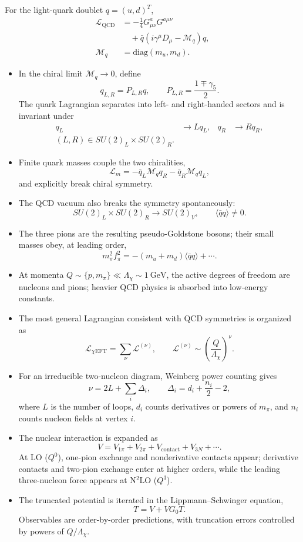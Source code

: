 \documentclass[a4paper]{article}
\newcommand{\bi}{\begin{itemize}}
\newcommand{\ei}{\end{itemize}}
\begin{document}
{
For the light-quark doublet $q=(u,d)^T$,
\[
\begin{aligned}
\mathcal{L}_{\mathrm{QCD}}
&=
-\frac{1}{4}G_{\mu\nu}^aG^{a\mu\nu}
\\
&\quad
+\bar q\left(i\gamma^\mu D_\mu-\mathcal{M}_q\right)q,
\\
\mathcal{M}_q
&=
\mathrm{diag}(m_u,m_d).
\end{aligned}
\]
\bi
\item In the chiral limit $\mathcal{M}_q\to0$, define
\[
q_{L,R}=P_{L,R}q,
\qquad
P_{L,R}=\frac{1\mp\gamma_5}{2}.
\]
The quark Lagrangian separates into left- and right-handed sectors and is invariant under
\[
\begin{aligned}
q_L&\to Lq_L,
&
q_R&\to Rq_R,
\\
(L,R)\in SU(2)_L\times SU(2)_R.
\end{aligned}
\]
\item Finite quark masses couple the two chiralities,
\[
\mathcal{L}_m
=
-\bar q_L\mathcal{M}_q q_R
-\bar q_R\mathcal{M}_q q_L,
\]
and explicitly break chiral symmetry.
\item The QCD vacuum also breaks the symmetry spontaneously:
\[
SU(2)_L\times SU(2)_R
\longrightarrow
SU(2)_V,
\qquad
\langle\bar q q\rangle\neq0.
\]
\item The three pions are the resulting pseudo-Goldstone bosons; their small masses obey, at leading order,
\[
m_\pi^2f_\pi^2
=
-(m_u+m_d)\langle\bar q q\rangle+\cdots.
\]
\ei
}

{
\bi
\item At momenta $Q\sim\{p,m_\pi\}\ll\Lambda_\chi\sim1~\mathrm{GeV}$, the active degrees of freedom are nucleons and pions; heavier QCD physics is absorbed into low-energy constants.
\item The most general Lagrangian consistent with QCD symmetries is organized as
\[
\mathcal{L}_{\chi\mathrm{EFT}}
=
\sum_{\nu}\mathcal{L}^{(\nu)},
\qquad
\mathcal{L}^{(\nu)}\sim
\left(\frac{Q}{\Lambda_\chi}\right)^\nu.
\]
\item For an irreducible two-nucleon diagram, Weinberg power counting gives
\[
\nu=2L+\sum_i\Delta_i,
\qquad
\Delta_i=d_i+\frac{n_i}{2}-2,
\]
where $L$ is the number of loops, $d_i$ counts derivatives or powers of $m_\pi$, and $n_i$ counts nucleon fields at vertex $i$.
\item The nuclear interaction is expanded as
\[
V=V_{1\pi}+V_{2\pi}+V_{\mathrm{contact}}+V_{3N}+\cdots.
\]
At LO ($Q^0$), one-pion exchange and nonderivative contacts appear; derivative contacts and two-pion exchange enter at higher orders, while the leading three-nucleon force appears at N$^2$LO ($Q^3$).
\item The truncated potential is iterated in the Lippmann--Schwinger equation,
\[
T=V+VG_0T.
\]
Observables are order-by-order predictions, with truncation errors controlled by powers of $Q/\Lambda_\chi$.
\ei
}
\end{document}
